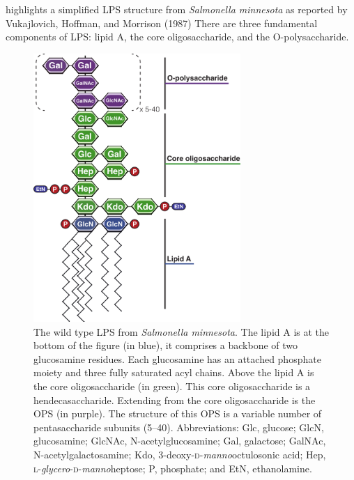  highlights a simplified \ac{LPS} structure from
\textit{Salmonella minnesota} as reported by Vukajlovich, Hoffman, and Morrison (1987)  There are three fundamental components of \ac{LPS}: lipid A, the core oligosaccharide, and the O-polysaccharide. 
\begin{figure}[p]
  	\begin{center}
   		\includegraphics[width=0.7\textwidth]{intro/img/lpsoverview.pdf}
   	\end{center}
   	\caption[Simplified structure of \ac{LPS} from \textit{Salmonella minnesota}]{
The wild type \ac{LPS} from \textit{Salmonella minnesota}. The lipid A is at the
bottom of the figure (in blue), it comprises a backbone of two glucosamine residues. Each
glucosamine has an attached phosphate moiety and  three fully saturated acyl
chains. Above the lipid A is the core oligosaccharide (in green). This core
oligosaccharide is a hendecasaccharide. Extending from the core oligosaccharide
is the \ac{OPS} (in purple). The structure of this \ac{OPS} is a variable number of
pentasaccharide subunits (5--40). Abbreviations: Glc, glucose; GlcN, glucosamine; GlcNAc,
N-acetylglucosamine; Gal, galactose;  GalNAc, N-acetylgalactosamine; Kdo,
3-deoxy-\textsc{d}-\textit{manno}octulosonic acid; Hep,
\textsc{l}-\textit{glycero}-\textsc{d}-\textit{manno}heptose; P, phosphate; and
EtN, ethanolamine.
}
   	\label{fig:lpsoverview}
\end{figure}   

